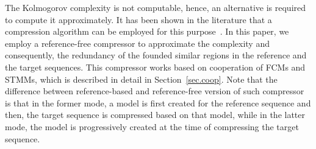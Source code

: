 The Kolmogorov complexity is not computable, hence, an alternative is required to compute it approximately. It has been shown in the literature that a compression algorithm can be employed for this purpose~\cite{zenil2015two,antao2018kolmogorov,faloutsos2007on}. In this paper, we employ a reference-free compressor to approximate the complexity and consequently, the redundancy of the founded similar regions in the reference and the target sequences. This compressor works based on cooperation of FCMs and STMMs, which is described in detail in Section~\ref{sec.coop}. Note that the difference between reference-based and reference-free version of such compressor is that in the former mode, a model is first created for the reference sequence and then, the target sequence is compressed based on that model, while in the latter mode, the model is progressively created at the time of compressing the target sequence.